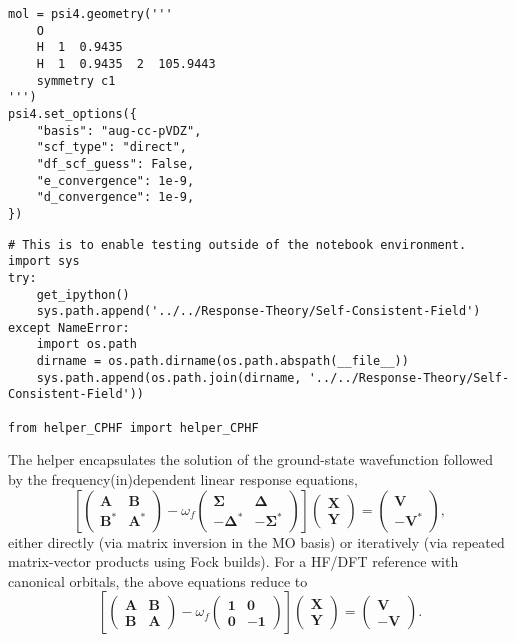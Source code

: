 \begin{verbatim}
mol = psi4.geometry('''
    O
    H  1  0.9435
    H  1  0.9435  2  105.9443
    symmetry c1
''')
psi4.set_options({
    "basis": "aug-cc-pVDZ",
    "scf_type": "direct",
    "df_scf_guess": False,
    "e_convergence": 1e-9,
    "d_convergence": 1e-9,
})
\end{verbatim}
\begin{verbatim}
# This is to enable testing outside of the notebook environment.
import sys
try:
    get_ipython()
    sys.path.append('../../Response-Theory/Self-Consistent-Field')
except NameError:
    import os.path
    dirname = os.path.dirname(os.path.abspath(__file__))
    sys.path.append(os.path.join(dirname, '../../Response-Theory/Self-Consistent-Field'))

from helper_CPHF import helper_CPHF
\end{verbatim}
The helper encapsulates the solution of the ground-state wavefunction followed by the frequency\textendash{}(in)dependent linear response equations,
\begin{equation}
  \left[
    \begin{pmatrix}
      \mathbf{A} & \mathbf{B} \\
      \mathbf{B}^{*} & \mathbf{A}^{*}
    \end{pmatrix}
    - \omega_{f}
    \begin{pmatrix}
      \mathbf{\Sigma} & \mathbf{\Delta} \\
      -\mathbf{\Delta}^{*} & -\mathbf{\Sigma}^{*}
    \end{pmatrix}
  \right]
  \begin{pmatrix}
    \mathbf{X} \\
    \mathbf{Y}
  \end{pmatrix}
  =
  \begin{pmatrix}
    \mathbf{V} \\
    -\mathbf{V}^{*}
  \end{pmatrix}
  ,
\end{equation}
either directly (via matrix inversion in the MO basis) or iteratively (via repeated matrix-vector products using Fock builds). For a HF/DFT reference with canonical orbitals, the above equations reduce to
\begin{equation}
  \label{eq:paper_05-neese-107}
  \left[
    \begin{pmatrix}
      \mathbf{A} & \mathbf{B} \\
      \mathbf{B} & \mathbf{A}
    \end{pmatrix}
    - \omega_{f}
    \begin{pmatrix}
      \mathbf{1} & \mathbf{0} \\
      \mathbf{0} & -\mathbf{1}
    \end{pmatrix}
  \right]
  \begin{pmatrix}
    \mathbf{X} \\
    \mathbf{Y}
  \end{pmatrix}
  =
  \begin{pmatrix}
    \mathbf{V} \\
    -\mathbf{V}
  \end{pmatrix}
  . \tag{Neese 107}
\end{equation}
